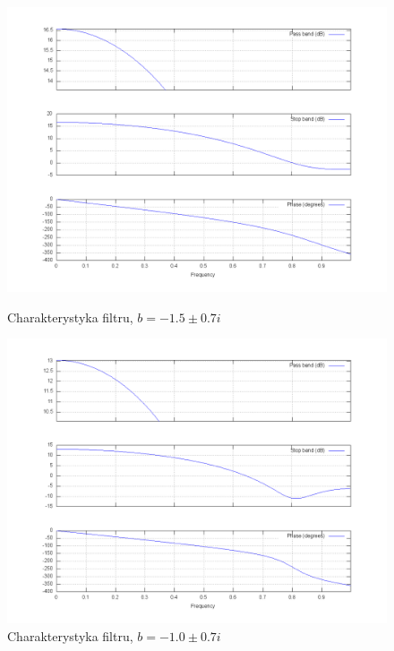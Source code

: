\documentclass[wide,a4paper,titlepage,12pt]{mwart}
\begin{document}
  \begin{figure}[htbp]
    \begin{center}
      \includegraphics[scale=.3]{out/fig23.png}
      \caption{\label{fig23} Charakterystyka filtru, $b=-1.5\pm0.7i$}
      \includegraphics[scale=.3]{out/fig24.png}
      \caption{\label{fig24} Charakterystyka filtru, $b=-1.0\pm0.7i$}

    \end{center}
  \end{figure}
\end{document}
